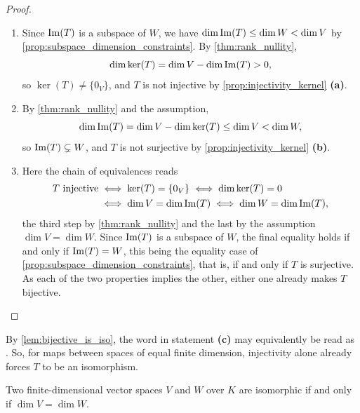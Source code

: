 \begin{proof}
\begin{enumerate}[label=\textbf{(\alph*)}]
    \item Since $\operatorname{Im}(T)$ is a subspace of $W$, we have $\dim \operatorname{Im}(T) \le \dim W < \dim V$ by \cref{prop:subspace_dimension_constraints}. By \cref{thm:rank_nullity},
    \[
    \dim \ker(T) = \dim V - \dim \operatorname{Im}(T) > 0,
    \]
    so $\ker(T) \neq \{0_V\}$, and $T$ is not injective by \cref{prop:injectivity_kernel} \textbf{(a)}.
    \item By \cref{thm:rank_nullity} and the assumption,
    \[
    \dim \operatorname{Im}(T) = \dim V - \dim \ker(T) \le \dim V < \dim W,
    \]
    so $\operatorname{Im}(T) \subsetneq W$, and $T$ is not surjective by \cref{prop:injectivity_kernel} \textbf{(b)}.
    \item Here the chain of equivalences reads
    \begin{align*}
    T \text{ injective} &\iff \ker(T) = \{0_V\} \iff \dim \ker(T) = 0 \\
    &\iff \dim V = \dim \operatorname{Im}(T) \iff \dim W = \dim \operatorname{Im}(T),
    \end{align*}
    the third step by \cref{thm:rank_nullity} and the last by the assumption $\dim V = \dim W$. Since $\operatorname{Im}(T)$ is a subspace of $W$, the final equality holds if and only if $\operatorname{Im}(T) = W$, this being the equality case of \cref{prop:subspace_dimension_constraints}, that is, if and only if $T$ is surjective. As each of the two properties implies the other, either one already makes $T$ bijective. \qedhere
\end{enumerate}
\end{proof}

\begin{remark}
By \cref{lem:bijective_is_iso}, the word  in statement \textbf{(c)} may equivalently be read as . So, for maps between spaces of equal finite dimension, injectivity alone already forces $T$ to be an isomorphism.
\end{remark}

\begin{corollary}
\label{cor:iso_iff_equal_dimension}
Two finite-di\-men\-sional vector spaces $V$ and $W$ over $K$ are isomorphic if and only if $\dim V = \dim W$.
\end{corollary}

